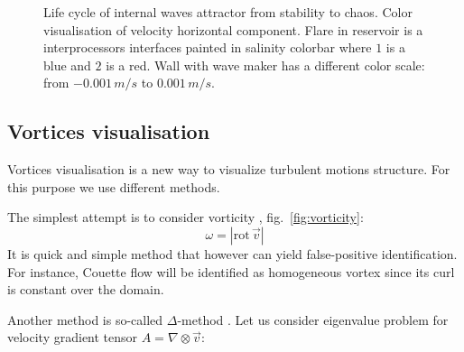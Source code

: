\documentclass[a4wide,fontsize=12pt]{article}
\begin{document}
\begin{figure}[!Ht]
\centering
    \begin{minipage}{0.45\textwidth}
        \centering
        \label{fig:3DTurbBegin}
    \end{minipage}
    \begin{minipage}{0.45\textwidth}
        \centering
        \label{fig:3DTurbEnd}
    \end{minipage}
    \caption{Life cycle of internal waves attractor from stability to chaos. Color visualisation of velocity horizontal component. Flare in reservoir is a interprocessors interfaces painted in salinity colorbar where $1$ is a blue and $2$ is a red. Wall with wave maker has a different color scale: from $-0.001\,m/s$ to $0.001\,m/s$.}
\end{figure}



\subsection{Vortices visualisation}

Vortices visualisation is a new way to visualize turbulent motions structure. For this purpose we use different methods.

The simplest attempt is to consider vorticity \cite{vortex}, fig.~\ref{fig:vorticity}: $$\omega=|\textrm{rot}\,\vec{v}|$$
It is quick and simple method that however can yield false-positive identification. For instance, Couette flow will be identified as homogeneous vortex since its curl is constant over the domain.

Another method is so-called $\Delta$-method \cite{vortex}. Let us consider eigenvalue problem for velocity gradient tensor $A=\nabla\otimes  \vec v$:

\end{document}
